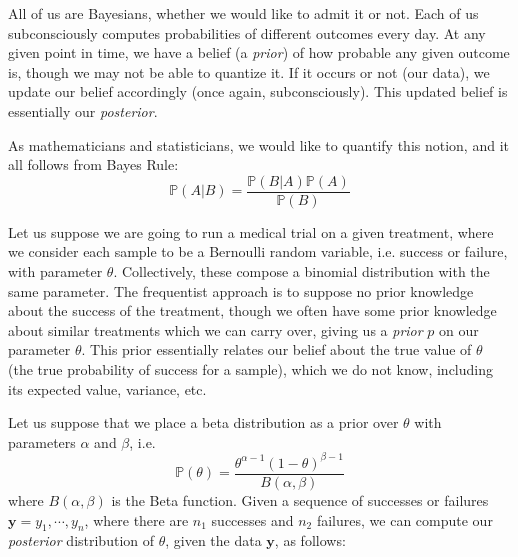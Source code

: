 
All of us are Bayesians, whether we would like to admit it or not. Each of us subconsciously computes probabilities of different outcomes every day. At any given point in time, we have a belief (a \emph{prior}) of how probable any given outcome is, though we may not be able to quantize it. If it occurs or not (our data), we update our belief accordingly (once again, subconsciously). This updated belief is essentially our \emph{posterior}.

As mathematicians and statisticians, we would like to quantify this notion, and it all follows from Bayes Rule:
\begin{equation*}
\mathbb{P}(A | B) = \frac{\mathbb{P}(B | A)\mathbb{P}(A)}{\mathbb{P}(B)}
\end{equation*}

Let us suppose we are going to run a medical trial on a given treatment, where we consider each sample to be a Bernoulli random variable, i.e. success or failure, with parameter $\theta$. Collectively, these compose a binomial distribution with the same parameter. The frequentist approach is to suppose no prior knowledge about the success of the treatment, though we often have some prior knowledge about similar treatments which we can carry over, giving us a \emph{prior} $p$ on our parameter $\theta$. This prior essentially relates our belief about the true value of $\theta$ (the true probability of success for a sample), which we do not know, including its expected value, variance, etc.

Let us suppose that we place a beta distribution as a prior over $\theta$ with parameters $\alpha$ and $\beta$, i.e. $$\mathbb{P}(\theta) = \frac{\theta^{\alpha - 1}(1 - \theta)^{\beta - 1}}{B(\alpha,\beta)}$$ where $B(\alpha,\beta)$ is the Beta function. Given a sequence of successes or failures $\mathbf{y} = y_{1},\cdots,y_{n}$, where there are $n_{1}$ successes and $n_{2}$ failures, we can compute our \emph{posterior} distribution of $\theta$, given the data $\mathbf{y}$, as follows:

